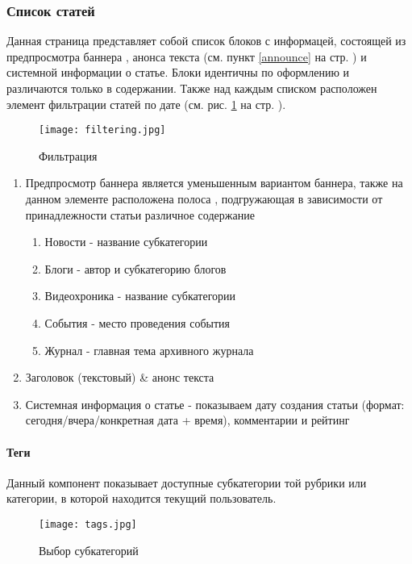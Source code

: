 \documentclass[DIV=calc, paper=a4, fontsize=11pt]{scrartcl} %
\begin{document}
\subsubsection{Список статей}
Данная страница представляет собой список блоков с информацей, состоящей из предпросмотра баннера , анонса текста (см. пункт \ref{announce} на стр. \pageref{announce}) и системной информации о статье. Блоки идентичны по оформлению и различаются только в содержании. Также над каждым списком расположен элемент фильтрации статей по дате (см. рис. \ref{fig:filtering.jpg} на стр. \pageref{fig:filtering.jpg}).
            \begin{figure}[ht!]
            \centering
            \texttt{[image: filtering.jpg]}
            \caption{Фильтрация \label{fig:filtering.jpg}}
            \end{figure}
\begin{enumerate}
    \item Предпросмотр баннера является уменьшенным вариантом баннера, также на данном элементе расположена полоса \label{whiteline}, подгружающая в зависимости от принадлежности статьи различное содержание
    \begin{enumerate}
        \item Новости - название субкатегории
        \item Блоги - автор и субкатегорию блогов
        \item Видеохроника - название субкатегории
        \item События - место проведения события
        \item Журнал - главная тема архивного журнала
    \end{enumerate}
    \item Заголовок (текстовый) \& анонс текста
    \item Системная информация о статье - показываем дату создания статьи (формат: сегодня/вчера/конкретная дата + время), комментарии и рейтинг
\end{enumerate}

\paragraph{Теги}
Данный компонент показывает доступные субкатегории той рубрики или категории, в которой находится текущий пользователь.
            \begin{figure}[ht!]
            \centering
            \texttt{[image: tags.jpg]}
            \caption{Выбор субкатегорий \label{fig:tags.jpg}}
            \end{figure}
\end{document}
